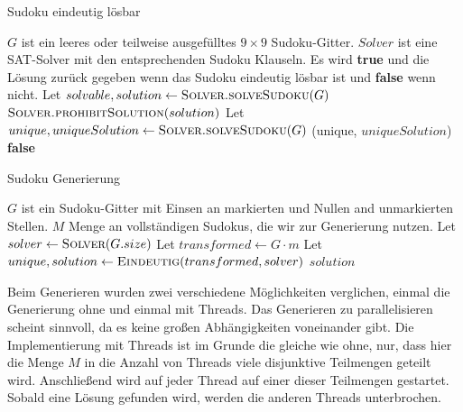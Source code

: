\begin{algorithm}
    \caption{Sudoku eindeutig lösbar}
    \label{alg:eindeutig}
    \begin{algorithmic}[1]
        \Require $G$ ist ein leeres oder teilweise ausgefülltes $9 \times 9$ Sudoku-Gitter.
        \Require $Solver$ ist eine SAT-Solver mit den entsprechenden Sudoku Klauseln.
        \Ensure Es wird \textbf{true} und die Lösung zurück gegeben wenn das Sudoku eindeutig lösbar ist und \textbf{false} wenn nicht.
            \State Let $solvable, solution \gets \Call{Solver.solveSudoku}{G}$
                \State $\Call{Solver.prohibitSolution}{solution}$
                \State Let $unique, uniqueSolution \gets \Call{Solver.solveSudoku}{G}$
                \State \Return (unique, $uniqueSolution$)
            \Else
                \State \Return \textbf{false}
            \EndIf
        \EndFunction
    \end{algorithmic}
\end{algorithm}


\begin{algorithm}
    \caption{Sudoku Generierung}
    \label{alg:generierung}
    \begin{algorithmic}[1]
        \Require $G$ ist ein Sudoku-Gitter mit Einsen an markierten und Nullen and unmarkierten Stellen.
        \Require $M$ Menge an vollständigen Sudokus, die wir zur Generierung nutzen.
            \State Let $solver \gets \Call{Solver}{G.size}$
                \State Let $transformed \gets G \cdot m$ 
                \State Let $unique, solution \gets \Call{Eindeutig}{transformed, solver}$
                    \State \Return $solution$
                \EndIf
            \EndFor

        \EndFunction
    \end{algorithmic}
\end{algorithm}

Beim Generieren wurden zwei verschiedene Möglichkeiten verglichen, einmal die Generierung ohne und einmal mit Threads.
Das Generieren zu parallelisieren scheint sinnvoll, da es keine großen Abhängigkeiten voneinander gibt.
Die Implementierung mit Threads ist im Grunde die gleiche wie ohne, nur, dass hier die Menge $M$ in die Anzahl von Threads viele disjunktive Teilmengen geteilt wird.
Anschließend wird auf jeder Thread auf einer dieser Teilmengen gestartet. Sobald eine Lösung gefunden wird, werden die anderen Threads unterbrochen.

